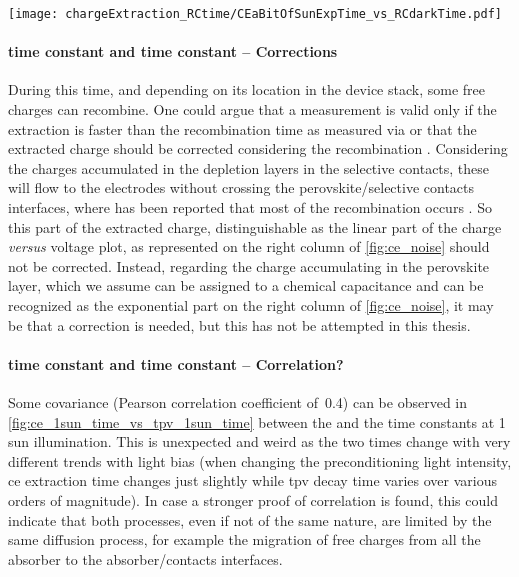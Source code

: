 		\begin{SCfigure}%
			\centering
			\texttt{[image: chargeExtraction\_RCtime/CEaBitOfSunExpTime\_vs\_RCdarkTime.pdf]}
			\label{fig:chargeExtraction_RCtime}
		\end{SCfigure}

		\paragraph{ time constant and  time constant -- Corrections}\label{characterization_ce_correction}
		During this time, and depending on its location in the device stack, some free charges can recombine.
		One could argue that a  measurement is valid only if the extraction is faster than the recombination time as measured via  \cite{Ryan2017a} or that the extracted charge should be corrected considering the recombination \cite{Credgington2011,Credgington2014}.
		Considering the charges accumulated in the depletion layers in the selective contacts, these will flow to the electrodes without crossing the perovskite/selective contacts interfaces, where has been reported that most of the recombination occurs \cite{Barnea-Nehoshtan2014,Stolterfoht2018a,Stolterfoht2018}.
		So this part of the extracted charge, distinguishable as the linear part of the charge \textsl{versus} voltage plot, as represented on the right column of \cref{fig:ce_noise} should not be corrected.
		Instead, regarding the charge accumulating in the perovskite layer, which we assume can be assigned to a chemical capacitance and can be recognized as the exponential part on the right column of \cref{fig:ce_noise}, it may be that a correction \cite{Shuttle2008a,Shuttle2008b} is needed, but this has not be attempted in this thesis.

		\paragraph{ time constant and  time constant -- Correlation?}
		Some covariance (Pearson correlation coefficient of~0.4) can be observed in \cref{fig:ce_1sun_time_vs_tpv_1sun_time} between the  and the  time constants at 1 sun illumination.
		This is unexpected and weird as the two times change with very different trends with light bias (when changing the preconditioning light intensity, \gls{ce} extraction time changes just slightly while \gls{tpv} decay time varies over various orders of magnitude).
		In case a stronger proof of correlation is found, this could indicate that both processes, even if not of the same nature, are limited by the same diffusion process, for example the migration of free charges from all the absorber to the absorber/contacts interfaces.

